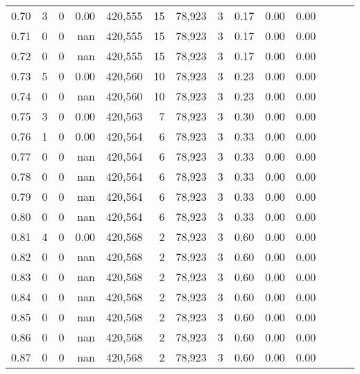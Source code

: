 \begin{tabular}{rrrrrrrrrrrrrr}
0.70 &       3 &       0 &  0.00 &  420,555 &       15 &  78,923 &       3 &  0.17 &  0.00 &      0.00 \\
0.71 &       0 &       0 &   nan &  420,555 &       15 &  78,923 &       3 &  0.17 &  0.00 &      0.00 \\
0.72 &       0 &       0 &   nan &  420,555 &       15 &  78,923 &       3 &  0.17 &  0.00 &      0.00 \\
0.73 &       5 &       0 &  0.00 &  420,560 &       10 &  78,923 &       3 &  0.23 &  0.00 &      0.00 \\
0.74 &       0 &       0 &   nan &  420,560 &       10 &  78,923 &       3 &  0.23 &  0.00 &      0.00 \\
0.75 &       3 &       0 &  0.00 &  420,563 &        7 &  78,923 &       3 &  0.30 &  0.00 &      0.00 \\
0.76 &       1 &       0 &  0.00 &  420,564 &        6 &  78,923 &       3 &  0.33 &  0.00 &      0.00 \\
0.77 &       0 &       0 &   nan &  420,564 &        6 &  78,923 &       3 &  0.33 &  0.00 &      0.00 \\
0.78 &       0 &       0 &   nan &  420,564 &        6 &  78,923 &       3 &  0.33 &  0.00 &      0.00 \\
0.79 &       0 &       0 &   nan &  420,564 &        6 &  78,923 &       3 &  0.33 &  0.00 &      0.00 \\
0.80 &       0 &       0 &   nan &  420,564 &        6 &  78,923 &       3 &  0.33 &  0.00 &      0.00 \\
0.81 &       4 &       0 &  0.00 &  420,568 &        2 &  78,923 &       3 &  0.60 &  0.00 &      0.00 \\
0.82 &       0 &       0 &   nan &  420,568 &        2 &  78,923 &       3 &  0.60 &  0.00 &      0.00 \\
0.83 &       0 &       0 &   nan &  420,568 &        2 &  78,923 &       3 &  0.60 &  0.00 &      0.00 \\
0.84 &       0 &       0 &   nan &  420,568 &        2 &  78,923 &       3 &  0.60 &  0.00 &      0.00 \\
0.85 &       0 &       0 &   nan &  420,568 &        2 &  78,923 &       3 &  0.60 &  0.00 &      0.00 \\
0.86 &       0 &       0 &   nan &  420,568 &        2 &  78,923 &       3 &  0.60 &  0.00 &      0.00 \\
0.87 &       0 &       0 &   nan &  420,568 &        2 &  78,923 &       3 &  0.60 &  0.00 &      0.00 \\

\end{tabular}
